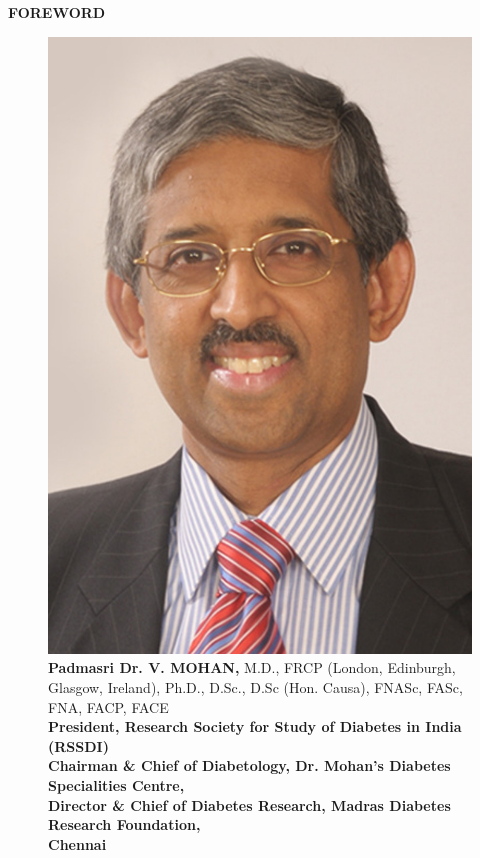 \thispagestyle{empty}

\begin{center}
\Huge\textbf{FOREWORD}
\end{center}

\vskip 10pt

\begin{figure}[h]
\centering
\includegraphics[scale=.9]{images/001.jpg}\\
\textbf{Padmasri Dr. V. MOHAN,} {\small M.D., FRCP (London, Edinburgh,\\ Glasgow, Ireland), Ph.D., D.Sc., D.Sc (Hon. Causa), FNASc, FASc,\\ FNA, FACP, FACE\\\textbf{President, Research Society for Study of Diabetes in India\\ (RSSDI)\\ Chairman \& Chief of Diabetology, Dr. Mohan’s Diabetes\\ Specialities Centre,\\ Director \& Chief of Diabetes Research, Madras Diabetes\\ Research Foundation,\\ Chennai}}
\end{figure}

